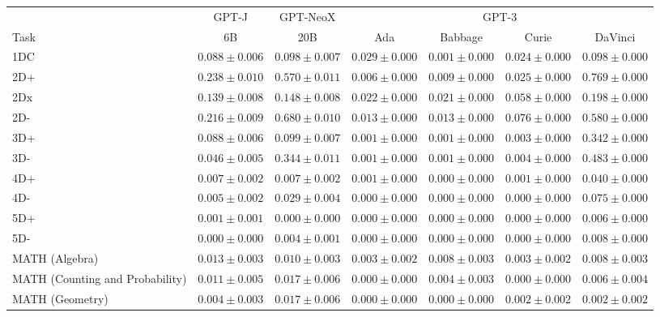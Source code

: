 \documentclass[11pt]{article}
\begin{document}
{\begin{landscape}
\begin{table}
\centering 
\begin{tabular}{l c c c c c c } \\ 
& GPT-J & GPT-NeoX & \multicolumn{4}{c}{GPT-3} \\
Task & 6B & 20B & Ada & Babbage & Curie & DaVinci \\ \toprule
1DC & $0.088 \pm 0.006$ & $0.098 \pm 0.007$ & $0.029 \pm 0.000$ & $0.001 \pm 0.000$ & $0.024 \pm 0.000$ & $0.098 \pm 0.000$ \\ 
2D+ & $0.238 \pm 0.010$ & $0.570 \pm 0.011$ & $0.006 \pm 0.000$ & $0.009 \pm 0.000$ & $0.025 \pm 0.000$ & $0.769 \pm 0.000$ \\ 
2Dx & $0.139 \pm 0.008$ & $0.148 \pm 0.008$ & $0.022 \pm 0.000$ & $0.021 \pm 0.000$ & $0.058 \pm 0.000$ & $0.198 \pm 0.000$ \\ 
2D- & $0.216 \pm 0.009$ & $0.680 \pm 0.010$ & $0.013 \pm 0.000$ & $0.013 \pm 0.000$ & $0.076 \pm 0.000$ & $0.580 \pm 0.000$ \\ 
3D+ & $0.088 \pm 0.006$ & $0.099 \pm 0.007$ & $0.001 \pm 0.000$ & $0.001 \pm 0.000$ & $0.003 \pm 0.000$ & $0.342 \pm 0.000$ \\ 
3D- & $0.046 \pm 0.005$ & $0.344 \pm 0.011$ & $0.001 \pm 0.000$ & $0.001 \pm 0.000$ & $0.004 \pm 0.000$ & $0.483 \pm 0.000$ \\ 
4D+ & $0.007 \pm 0.002$ & $0.007 \pm 0.002$ & $0.001 \pm 0.000$ & $0.000 \pm 0.000$ & $0.001 \pm 0.000$ & $0.040 \pm 0.000$ \\ 
4D- & $0.005 \pm 0.002$ & $0.029 \pm 0.004$ & $0.000 \pm 0.000$ & $0.000 \pm 0.000$ & $0.000 \pm 0.000$ & $0.075 \pm 0.000$ \\ 
5D+ & $0.001 \pm 0.001$ & $0.000 \pm 0.000$ & $0.000 \pm 0.000$ & $0.000 \pm 0.000$ & $0.000 \pm 0.000$ & $0.006 \pm 0.000$ \\ 
5D- & $0.000 \pm 0.000$ & $0.004 \pm 0.001$ & $0.000 \pm 0.000$ & $0.000 \pm 0.000$ & $0.000 \pm 0.000$ & $0.008 \pm 0.000$ \\ 
MATH (Algebra) & $0.013 \pm 0.003$ & $0.010 \pm 0.003$ & $0.003 \pm 0.002$ & $0.008 \pm 0.003$ & $0.003 \pm 0.002$ & $0.008 \pm 0.003$ \\ 
MATH (Counting and Probability) & $0.011 \pm 0.005$ & $0.017 \pm 0.006$ & $0.000 \pm 0.000$ & $0.004 \pm 0.003$ & $0.000 \pm 0.000$ & $0.006 \pm 0.004$ \\ 
MATH (Geometry) & $0.004 \pm 0.003$ & $0.017 \pm 0.006$ & $0.000 \pm 0.000$ & $0.000 \pm 0.000$ & $0.002 \pm 0.002$ & $0.002 \pm 0.002$ \\ 

\end{tabular}
\end{table}
\end{landscape}}
\end{document}
